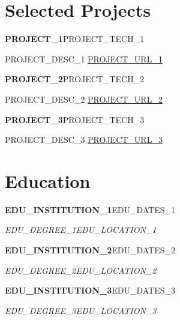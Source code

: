 \documentclass[10pt,a4paper]{article}
\newcommand{\entry}[4]{%
  {\color{accent}\bfseries #1}\hfill {\color{muted}\small #2}\par
  \vspace{1pt}
  {\itshape #3}\hfill {\color{muted}\small\itshape #4}\par
  \vspace{3pt}%
}
\newcommand{\project}[2]{%
  {\color{accent}\bfseries #1}\hfill {\color{muted}\small #2}\par
  \vspace{2pt}%
}
\begin{document}
\section{Selected Projects}
\project{{{PROJECT_1}}}{{{PROJECT_TECH_1}}}
\begin{tight}
  \item {{PROJECT_DESC_1}} \href{https://{{PROJECT_URL_1}}}{{{PROJECT_URL_1}}}
\end{tight}

\project{{{PROJECT_2}}}{{{PROJECT_TECH_2}}}
\begin{tight}
  \item {{PROJECT_DESC_2}} \href{https://{{PROJECT_URL_2}}}{{{PROJECT_URL_2}}}
\end{tight}

\project{{{PROJECT_3}}}{{{PROJECT_TECH_3}}}
\begin{tight}
  \item {{PROJECT_DESC_3}} \href{https://{{PROJECT_URL_3}}}{{{PROJECT_URL_3}}}
\end{tight}

\section{Education}
\entry{{{EDU_INSTITUTION_1}}}{{{EDU_DATES_1}}}{{{EDU_DEGREE_1}}}{{{EDU_LOCATION_1}}}
\vspace{-4pt}
\entry{{{EDU_INSTITUTION_2}}}{{{EDU_DATES_2}}}{{{EDU_DEGREE_2}}}{{{EDU_LOCATION_2}}}
\vspace{-4pt}
\entry{{{EDU_INSTITUTION_3}}}{{{EDU_DATES_3}}}{{{EDU_DEGREE_3}}}{{{EDU_LOCATION_3}}}
\end{document}
